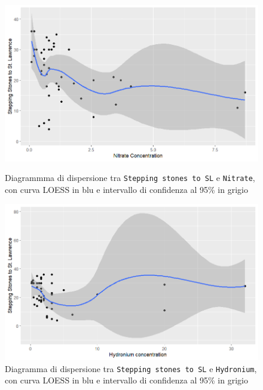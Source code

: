 \documentclass{article} %
\begin{document}
\begin{figure}[H]
    \centering
    \begin{minipage}{0.49\textwidth}
        \centering
        \includegraphics[width=\textwidth]{immagini/sl_nitrate.png}
        \captionsetup{justification=centering}
        \caption{Diagrammma di dispersione tra \texttt{Stepping stones to SL} e \texttt{Nitrate}, con curva LOESS in blu e intervallo di confidenza al 95\% in grigio}
    \end{minipage}
    \hfill
    \begin{minipage}{0.49\textwidth}
        \centering
        \includegraphics[width=\textwidth]{immagini/sl_hy.png}
        \captionsetup{justification=centering}
        \caption{Diagramma di dispersione tra \texttt{Stepping stones to SL} e \texttt{Hydronium}, con curva LOESS in blu e intervallo di confidenza al 95\% in grigio}
    \end{minipage}
\end{figure}
\end{document}
